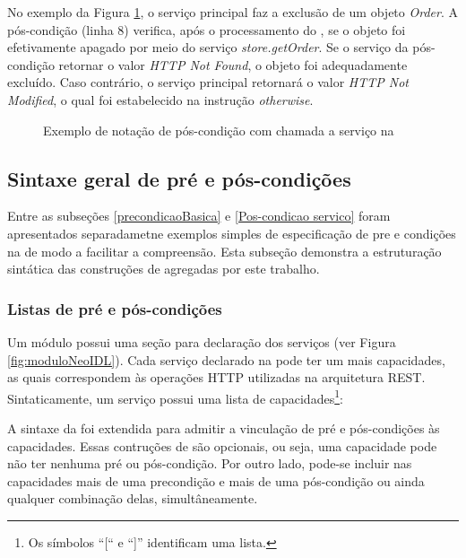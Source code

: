 No exemplo da Figura \ref{lst:DBCPosCondServico}, o serviço principal faz a
exclusão de um objeto \textit{Order}. A pós-condição (linha 8) verifica, após o
processamento do , se o objeto foi efetivamente apagado por meio do
serviço \emph{store.getOrder}. Se o serviço da pós-condição retornar o valor
\emph{HTTP Not Found}, o objeto foi adequadamente excluído. Caso contrário, o
serviço principal retornará o valor \emph{HTTP Not Modified}, o qual foi
estabelecido na instrução \textit{otherwise}.

\begin{figure}[htb]
\begin{small}

\end{small}
\caption{Exemplo de notação de pós-condição com chamada a serviço na
\neoidl{}}
\label{lst:DBCPosCondServico}
\end{figure} 


\subsection{Sintaxe geral de pré e pós-condições}
\label{SintaxeGeralDbc}

Entre as subseções \ref{precondicaoBasica} e \ref{Pos-condicao servico} foram
apresentados separadametne exemplos simples de especificação de pre e condições
na \neoidl{} de modo a facilitar a compreensão. Esta subseção demonstra
a estruturação sintática das construções de \designbycontract{} agregadas
\neoidl{} por este trabalho.

\subsubsection{Listas de pré e pós-condições}

Um módulo \neoidl{} possui uma seção para declaração dos serviços (ver Figura
\ref{fig:moduloNeoIDL}). Cada serviço declarado na \neoidl{} pode ter um mais
capacidades, as quais correspondem às operações HTTP utilizadas na arquitetura
REST. Sintaticamente, um serviço possui uma lista de capacidades\footnote{Os
símbolos ``[`` e ``]'' identificam uma lista.}:

\begin{center}
\end{center}

A sintaxe da \neoidl{} foi extendida para admitir a vinculação de pré e
pós-condições às capacidades. Essas contruções de \designbycontract{} são
opcionais, ou seja, uma capacidade pode não ter nenhuma pré ou pós-condição. Por
outro lado, pode-se incluir nas capacidades mais de uma precondição e mais de
uma pós-condição ou ainda qualquer combinação delas, simultâneamente.

